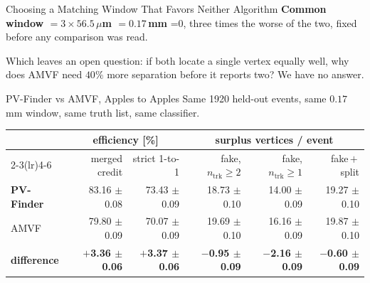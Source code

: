 \documentclass[xcolor=table,aspectratio=169]{beamer}
\newcommand{\ntrk}{\ensuremath{n_\mathrm{trk}}}
\providecommand{\talkbuild}{0}
\newcommand{\readingonly}[1]{\ifnum\talkbuild=0\relax#1\fi}
\begin{document}
\begin{frame}{Choosing a Matching Window That Favors Neither Algorithm}
    \vspace{0.2em}
    \centering
    \textcolor{pennred}{\textbf{Common window $= 3 \times 56.5\,\mu$m $= 0.17$\,mm}}%
    \readingonly{, three times the worse of the two, fixed before any comparison was
    read.\\[0.15em]
    \parbox{0.90\linewidth}{\centering\footnotesize\textcolor{black!65}{Which leaves an
    open question: if both locate a single vertex equally well, why does AMVF need
    $40\%$ more separation before it reports two? We have no answer.}}}
\end{frame}

\begin{frame}{PV-Finder vs AMVF, Apples to Apples}
    \vspace{-0.2em}
    \centering
    \scriptsize
    Same 1920 held-out events, same $0.17$\,mm window, same truth list, same
    classifier.
    \vspace{0.35em}

    \setlength{\tabcolsep}{7pt}
    \begin{tabular}{l rr rrr}
        \toprule
        & \multicolumn{2}{c}{\textcolor{black!55}{efficiency [\%]}}
        & \multicolumn{3}{c}{\textcolor{black!55}{surplus vertices / event}} \\
        \cmidrule(lr){2-3}\cmidrule(lr){4-6}
        & merged credit & strict 1-to-1
        & fake, $\ntrk\!\geq\!2$ & fake, $\ntrk\!\geq\!1$ & fake\,$+$\,split \\
        \midrule
        \textbf{PV-Finder} & 83.16 $\pm$ 0.08 & 73.43 $\pm$ 0.09 & 18.73 $\pm$ 0.10 & 14.00 $\pm$ 0.09 & 19.27 $\pm$ 0.10 \\
        AMVF               & 79.80 $\pm$ 0.09 & 70.07 $\pm$ 0.09 & 19.69 $\pm$ 0.10 & 16.16 $\pm$ 0.09 & 19.87 $\pm$ 0.10 \\
        \midrule
        \rowcolor{black!8}
        \textbf{difference}
        & \textcolor{pennred}{\textbf{$+$3.36 $\pm$ 0.06}} & \textbf{$+$3.37 $\pm$ 0.06}
        & \textbf{$-$0.95 $\pm$ 0.09} & \textbf{$-$2.16 $\pm$ 0.09} & \textbf{$-$0.60 $\pm$ 0.09} \\
        \bottomrule
    \end{tabular}
    \vspace{0.9em}


\end{frame}
\end{document}
